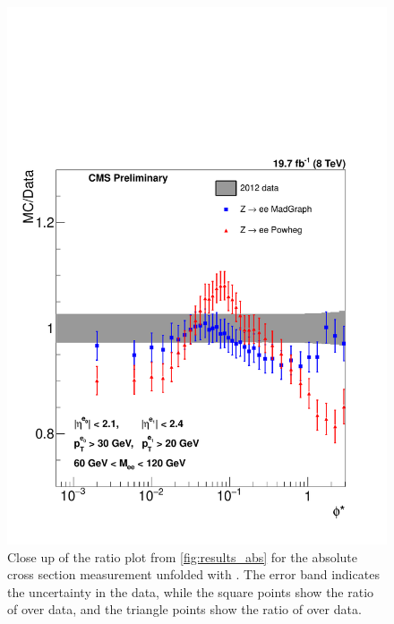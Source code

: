 \begin{figure}[!p]
    \centering
    \includegraphics[width=\textwidth]{figures/ZShape_Ratioelec_Abs_Dressed.pdf}
    \caption[
        Close up of the ratio plot from \cref{fig:results_abs} for the absolute
        cross section measurement unfolded with \MADGRAPH.
    ]{
        Close up of the ratio plot from \cref{fig:results_abs} for the absolute
        cross section measurement unfolded with \MADGRAPH. The error band
        indicates the uncertainty in the data, while the square points show the
        ratio of \MADGRAPH over data, and the triangle points show the ratio of
        \PPsixZtwo over data.
    }
    \label{fig:results_ratio_abs}
\end{figure}
